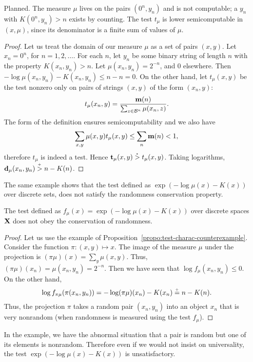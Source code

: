 \begin{formalization}
Planned. The measure $\mu$ lives on the pairs $(0^{n},y_{n})$ and is not computable; a $y_{n}$
with $K(0^{n},y_{n})>n$ exists by counting. The test $t_{\mu}$ is lower semicomputable in
$(x,\mu)$, since its denominator is a finite sum of values of $\mu$.
\end{formalization}
 \begin{proof}
Let us treat the domain of our measure \( \mu \) as a set of pairs \( (x,y) \).
Let \( x_{n} = 0^{n} \), for \( n=1,2,\dotsc \).
For each \( n \), let \( y_{n} \) be some binary string of length \( n \)
with the property \( K(x_{n}, y_{n}) > n \).
Let \( \mu(x_{n},y_{n})=2^{-n} \), and 0 elsewhere.
Then \( - \log \mu(x_{n},y_{n}) - K(x_{n},y_{n}) \le n - n = 0 \).
On the other hand, let \( t_{\mu}(x,y) \) be the test nonzero only on pairs of strings
\( (x,y) \) of the form \(( x_{n},y) \):
 \[
 t_{\mu}(x_{n}, y) = \frac{\mathbf{m}(n)}{\sum_{z \in \mathcal{B}^{n}} \mu(x_{n}, z)}.
 \]
The form of the definition ensures semicomputability and we also have
 \[
 \sum_{x,y} \mu(x,y) t_{\mu}(x,y) \le \sum_{n} \mathbf{m}(n) < 1,
 \]
therefore \( t_{\mu} \) is indeed a test.
Hence \( \mathbf{t}_{\mu}(x,y) \stackrel{{}_*}{>} t_{\mu}(x,y) \).
Taking logarithms, \( \mathbf{d}_{\mu}(x_{n}, y_{n}) \stackrel{{}_+}{>} n - K(n) \).
 \end{proof}

 The same example shows that the test defined as
\( \exp(-\log\mu(x) - K(x)) \) over discrete sets,
does not satisfy the randomness conservation property.

 \begin{proposition}
  \label{prop:g4.6.2}
The test defined as \( f_{\mu}(x) = \exp(-\log\mu(x) - K(x)) \) 
over discrete spaces \( \mathbf{X} \) does
not obey the conservation of randomness.
 \end{proposition}
 \begin{proof}
Let us use the example of Proposition~\ref{propo:test-charac-counterexample}.
Consider the function \( \pi : (x,y) \mapsto x \).
The image of the measure \( \mu \) under the projection is 
\( (\pi\mu)(x) = \sum_{y} \mu(x,y) \).
Thus, \( (\pi\mu)(x_{n}) = \mu(x_{n},y_{n}) = 2^{-n} \).
Then we have seen that \( \log f_{\mu}(x_{n},y_{n}) \le 0 \).
On the other hand,
 \[ 
 \log f_{\pi\mu} (\pi(x_{n},y_{n})) = -\log(\pi\mu)(x_{n}) - K(x_{n})
 \stackrel{{}_+}{=} n - K(n). 
 \]
Thus, the projection \( \pi \) takes a random pair \( (x_{n},y_{n}) \) into
an object \( x_{n} \) that is very nonrandom (when randomness is measured using
the test \( f_{\mu} \)).
 \end{proof}
In the example, we have the abnormal situation that a pair is random but
one of its elements is nonrandom.
Therefore even if we would not insist on universality, the test 
\( \exp(-\log\mu(x) - K(x)) \) is unsatisfactory.

